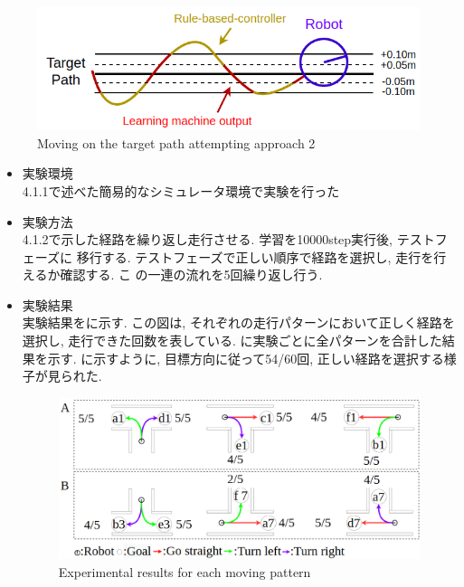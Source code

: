 \begin{figure}[hbtp]
  \centering
 \includegraphics[keepaspectratio, scale=0.58]
      {images/act1.5.png}
 \caption{Moving on the target path attempting approach 2}
 \label{Fig:act1.5}
\end{figure}

\begin{itemize}
  \item 実験環境\\
  4.1.1で述べた簡易的なシミュレータ環境で実験を行った
  \item 実験方法\\
  4.1.2で示した経路を繰り返し走行させる. 学習を10000step実行後, テストフェーズに
  移行する. テストフェーズで正しい順序で経路を選択し, 走行を行えるか確認する. こ
  の一連の流れを5回繰り返し行う.
  \item 実験結果\\
  実験結果をに示す. この図は, それぞれの走行パターンにおいて正しく経路を選択し, 走行できた回数を表している. に実験ごとに全パターンを合計した結果を示す. 
  に示すように, 目標方向に従って54/60回, 正しい経路を選択する様子が見られた.

  
  \begin{figure}[hbtp]
    \centering
   \includegraphics[keepaspectratio, scale=0.3]
        {images/10000step_act1.5.png}
   \caption{Experimental results for each moving pattern}
   \label{Fig:10000step_act1.5}
  \end{figure}  
  

\end{itemize}
